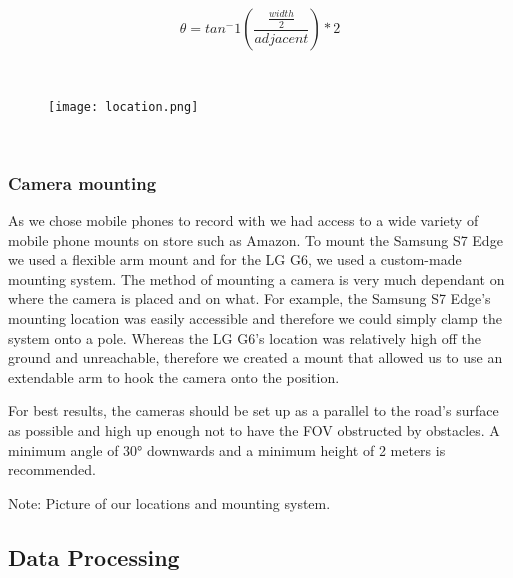 \begin{equation}
    \theta = tan^-1(\frac{\frac{width}{2}}{adjacent}) * 2\label{eq:1}
  \end{equation}

\ \\ 
\begin{figure}[h]
\texttt{[image: location.png]}
\centering 
\end{figure}
\label{Camera location}

\ \\

\subsubsection{Camera mounting}


As we chose mobile phones to record with we had access to a wide variety of mobile phone mounts on store such as Amazon.
To mount the Samsung S7 Edge we used a flexible arm mount and for the LG G6, we used a custom-made mounting system.
The method of mounting a camera is very much dependant on where the camera is placed and on what. For example, the Samsung S7 Edge's
mounting location was easily accessible and therefore we could simply clamp the system onto a pole. Whereas the LG G6's location was relatively high off the ground and unreachable, therefore we created a mount that allowed us to use an extendable arm to hook the camera onto the position.

For best results, the cameras should be set up as a parallel to the road's surface as possible and high up enough not to have the FOV obstructed by obstacles.
A minimum angle of 30° downwards and a minimum height of 2 meters is recommended.

Note: Picture of our locations and mounting system.

\subsection{Data Processing}

